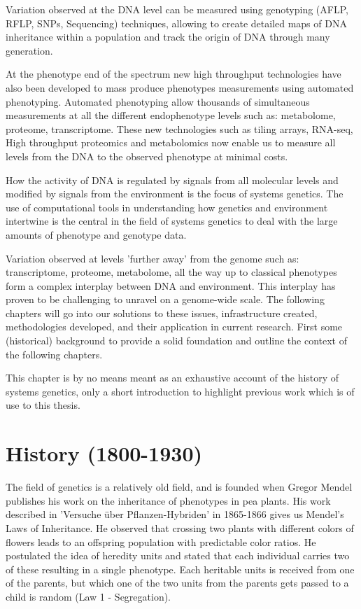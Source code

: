 Variation observed at the DNA level can be measured using genotyping (AFLP, RFLP, 
SNPs, Sequencing) techniques, allowing to create detailed maps of DNA inheritance 
within a population and track the origin of DNA through many generation.

At the phenotype end of the spectrum new high throughput technologies have also 
been developed to mass produce phenotypes measurements using automated phenotyping. 
Automated phenotyping allow thousands of simultaneous measurements at all the 
different endophenotype levels such as: metabolome, proteome, transcriptome. These 
new technologies such as tiling arrays, RNA-seq, High throughput proteomics and 
metabolomics now enable us to measure all levels from the DNA to the observed 
phenotype at minimal costs.

How the activity of DNA is regulated by signals from all molecular levels and modified by 
signals from the environment is the focus of systems genetics. The use of computational 
tools in understanding how genetics and environment intertwine is the central in the 
field of systems genetics to deal with the large amounts of phenotype and genotype data.

Variation observed at levels 'further away' from the genome such as: transcriptome, 
proteome, metabolome, all the way up to classical phenotypes form a complex interplay 
between DNA and environment. This interplay has proven to be challenging to unravel 
on a genome-wide scale. The following chapters will go into our solutions to these issues, 
infrastructure created, methodologies developed, and their application in current 
research. First some (historical) background to provide a solid foundation  and outline
the context of the following chapters. 

This chapter is by no means meant as an exhaustive account of the history of systems genetics, 
only a short introduction to highlight previous work which is of use to this thesis.

\section{History (1800-1930)}

The field of genetics is a relatively old field, and is founded when Gregor 
Mendel publishes his work on the inheritance of phenotypes in pea plants. 
His work described in 'Versuche \"uber Pflanzen-Hybriden' in 1865-1866 
\cite{Mendel:1866} gives us Mendel's Laws of Inheritance. He observed that 
crossing two plants with different colors of flowers leads to an offspring 
population with predictable color ratios. He postulated the idea of heredity 
units and stated that each individual carries two of these resulting in a 
single phenotype. Each heritable units is received from one of the parents, 
but which one of the two units from the parents gets passed to a child is random 
(Law 1 - Segregation).

